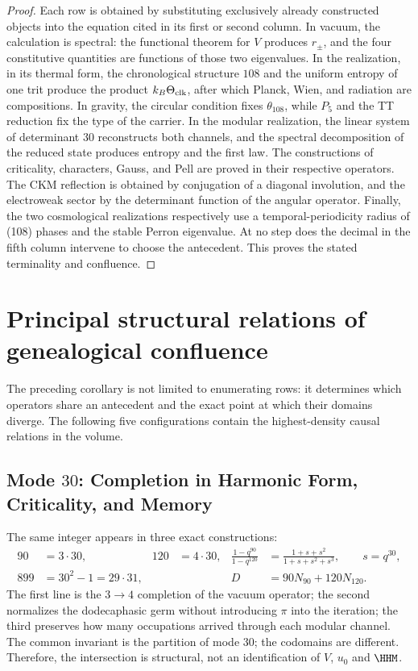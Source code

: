 \begin{proof}
Each row is obtained by substituting exclusively already constructed objects into the
equation cited in its first or second column. In vacuum, the calculation
is spectral: the functional theorem for \(V\) produces \(r_\pm\), and the four
constitutive quantities are functions of those two eigenvalues. In the realization, in its thermal
form, the chronological structure \(108\) and the uniform entropy of
one trit produce the product
\(k_B\Theta_{\rm clk}\), after which Planck, Wien, and radiation are
compositions. In gravity, the circular condition fixes
\(\theta_{108}\), while \(P_5\) and the TT reduction fix the type of the
carrier. In the modular realization, the linear system of determinant \(30\)
reconstructs both channels, and the spectral decomposition of the reduced state
produces entropy and the first law. The constructions of criticality,
characters, Gauss, and
Pell are proved in their respective operators. The CKM reflection is obtained
by conjugation of a diagonal involution, and the electroweak sector by
the determinant function of the angular operator. Finally, the two
cosmological realizations respectively use a temporal-periodicity radius of (108) phases and the stable
Perron eigenvalue. At no step does the decimal in the fifth column intervene to
choose the antecedent. This proves the stated terminality and confluence.
\end{proof}

\section{Principal structural relations of genealogical confluence}

The preceding corollary is not limited to enumerating rows: it determines which
operators share an antecedent and the exact point at which their domains
diverge. The following five configurations contain the highest-density
causal relations in the volume.

\subsection{Mode \(30\): Completion in Harmonic Form, Criticality, and Memory}

The same integer appears in three exact constructions:
\begin{equation}
\begin{aligned}
90&=3\cdot30, &120&=4\cdot30,
&\frac{1-q^{90}}{1-q^{120}}
 &=\frac{1+s+s^2}{1+s+s^2+s^3},\qquad s=q^{30},\\
899&=30^2-1=29\cdot31,
&&&D&=90N_{90}+120N_{120}.
\end{aligned}
\label{eq:atlas-mode30-confluence}
\end{equation}
The first line is the \(3\to4\) completion of the vacuum operator; the
second normalizes the dodecaphasic germ without introducing \(\pi\) into the
iteration; the third preserves how many occupations arrived through each modular
channel. The common invariant is the partition of mode \(30\); the
codomains are different. Therefore, the intersection is structural, not an
identification of \(V\), \(u_0\) and \(\HHM\).

